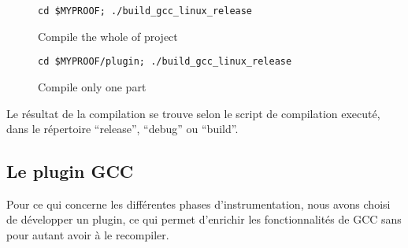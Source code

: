 \begin{figure}[here]
  \centering
  \verb#cd $MYPROOF; ./build_gcc_linux_release#
  \caption{Compile the whole of project}
  \label{fig:compile_whole_project}
\end{figure}

\begin{figure}[here]
  \centering
  \verb#cd $MYPROOF/plugin; ./build_gcc_linux_release#
  \caption{Compile only one part}
  \label{fig:compile_one_part}
\end{figure}

Le résultat de la compilation se trouve selon le script de compilation executé, dans le répertoire ``release'', ``debug'' ou ``build''.

\subsection{Le plugin GCC}

Pour ce qui concerne les différentes phases d'instrumentation, nous avons choisi de développer un plugin, ce qui permet d'enrichir les fonctionnalités de GCC sans pour autant avoir à le recompiler.


